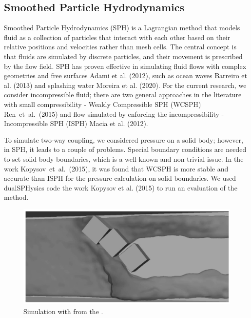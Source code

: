 \subsection{Smoothed Particle Hydrodynamics}

Smoothed Particle Hydrodynamics (SPH) is a Lagrangian method that models fluid as a collection of particles that interact with each other based on their relative positions and velocities rather than mesh cells. The central concept is that fluids are simulated by discrete particles, and their movement is prescribed by the flow field. SPH has proven effective in simulating fluid flows with complex geometries and free surfaces Adami et al. (2012)\cite{adami2012SPH}, such as ocean waves Barreiro et al. (2013)\cite{barreiro2013SPH} and splashing water Moreira et al. (2020)\cite{moreira2020SPH}. For the current research, we consider incompressible fluid; there are two general approaches in the literature with small compressibility - Weakly Compressible SPH (WCSPH) Ren~et~al.~(2015)\cite{ren2015nonlinear} and flow simulated by enforcing the incompressibility -  Incompressible SPH (ISPH) Macia et al. (2012)\cite{macia2012boundary}. 

To simulate two-way coupling, we considered pressure on a solid body; however, in SPH, it leads to a couple of problems. Special boundary conditions are needed to set solid body boundaries, which is a well-known and non-trivial issue. In the work Kopysov~et~al.~(2015)\cite{kopysov2015modeling}, it was found that WCSPH is more stable and accurate than ISPH for the pressure calculation on solid boundaries. We used dualSPHysics code \cite{Dual_SPH2019accuracy} the work Kopysov et al. (2015) \cite{kopysov2015modeling} to run an evaluation of the method.

\begin{figure}[!ht]
    \centering
    \includegraphics[width=16cm]{Images/chap1/3_blocks_SPH.png}
    \caption{Simulation with \cite{Dual_SPH2019accuracy} from the \cite{sarmakeeva2017meshfree}.}
    \label{fig:3_blocks_SPH}
\end{figure}

